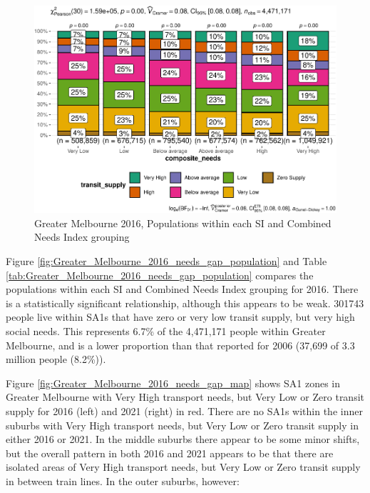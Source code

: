 \documentclass[preprint, 3p,
authoryear]{elsarticle} %
\begin{document}
\begin{figure}
\centering
\includegraphics{Leveraging_GTFS_to_assess_transit_supply_Transport_Geography_files/figure-latex/Greater_Melbourne_2016_needs_gap_population-1.pdf}
\caption{Greater Melbourne 2016, Populations within each SI and Combined
Needs Index grouping}
\end{figure}

Figure \ref{fig:Greater_Melbourne_2016_needs_gap_population} and Table
\ref{tab:Greater_Melbourne_2016_needs_gap_population} compares the
populations within each SI and Combined Needs Index grouping for 2016.
There is a statistically significant relationship, although this appears
to be weak. 301743 people live within SA1s that have zero or very low
transit supply, but very high social needs. This represents 6.7\% of the
4,471,171 people within Greater Melbourne, and is a lower proportion
than that reported for 2006 (37,699 of 3.3 million people (8.2\%)).

Figure \ref{fig:Greater_Melbourne_2016_needs_gap_map} shows SA1 zones in
Greater Melbourne with Very High transport needs, but Very Low or Zero
transit supply for 2016 (left) and 2021 (right) in red. There are no
SA1s within the inner suburbs with Very High transport needs, but Very
Low or Zero transit supply in either 2016 or 2021. In the middle suburbs
there appear to be some minor shifts, but the overall pattern in both
2016 and 2021 appears to be that there are isolated areas of Very High
transport needs, but Very Low or Zero transit supply in between train
lines. In the outer suburbs, however:
\end{document}
